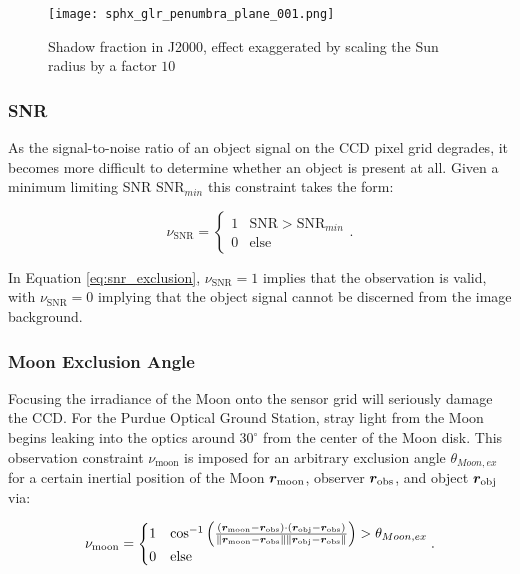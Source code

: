 \graphicspath{{/Users/liamrobinson/Documents/PyLightCurves/docs/build/html/_images}}
\begin{figure}[!htb]
  \centering
  \texttt{[image: sphx\_glr\_penumbra\_plane\_001.png]}
  \caption{Shadow fraction in J2000, effect exaggerated by scaling the Sun radius by a factor $10$}
  \label{fig:penumbra}
\end{figure}
\graphicspath{{/Users/liamrobinson/Documents/msthesis/static_images/aas_2022_figs}}

\subsubsection{SNR}

As the signal-to-noise ratio of an object signal on the CCD pixel grid degrades, it becomes more difficult to determine whether an object is present at all. Given a minimum limiting SNR $\mathrm{SNR}_{min}$ this constraint takes the form:

\begin{equation} \label{eq:snr_exclusion}
  \nu_{\mathrm{SNR}} = \begin{cases}
    1 & \mathrm{SNR} > \mathrm{SNR}_{min}\\
    0 & \mathrm{else}
  \end{cases}.
\end{equation}

In Equation \ref{eq:snr_exclusion}, $\nu_{\mathrm{SNR}} = 1$ implies that the observation is valid, with $\nu_{\mathrm{SNR}} = 0$ implying that the object signal cannot be discerned from the image background.

\subsubsection{Moon Exclusion Angle}

Focusing the irradiance of the Moon onto the sensor grid will seriously damage the CCD. For the Purdue Optical Ground Station, stray light from the Moon begins leaking into the optics around $30^\circ$ from the center of the Moon disk. This observation constraint $\nu_\mathrm{moon}$ is imposed for an arbitrary exclusion angle $\theta_{Moon,ex}$ for a certain inertial position of the Moon $\bm{r}_\mathrm{moon}$, observer $\bm{r}_\mathrm{obs}$, and object $\bm{r}_\mathrm{obj}$ via:

\begin{equation} \label{eq:moon_exclusion}
  \nu_\mathrm{moon} = \begin{cases}
    1 & \cos^{-1}\left( \frac{\left( \bm{r}_\mathrm{moon} - \bm{r}_\mathrm{obs} \right) \cdot \left( \bm{r}_\mathrm{obj} - \bm{r}_\mathrm{obs} \right)}{\| \bm{r}_\mathrm{moon} - \bm{r}_\mathrm{obs} \| \| \bm{r}_\mathrm{obj} - \bm{r}_\mathrm{obs} \|} \right) > \theta_{Moon,ex}\\
    0 & \mathrm{else}
  \end{cases}.
\end{equation}

